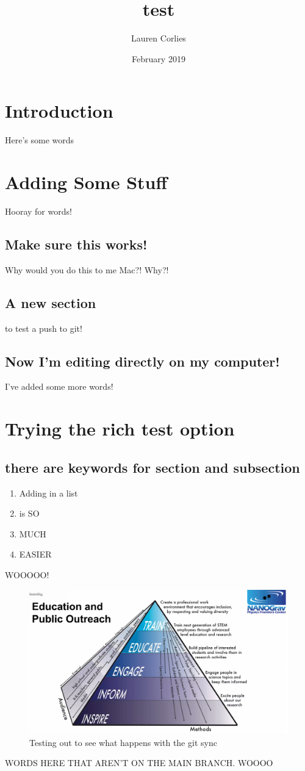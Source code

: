 \documentclass{article}
\title{test}
\author{Lauren Corlies}
\date{February 2019}
\begin{document}
\maketitle

\section{Introduction}
Here's some words

\section{Adding Some Stuff}
Hooray for words!

\subsection{Make sure this works!}
Why would you do this to me Mac?! Why?!

\subsection{A new section}
to test a push to git!

\subsection{Now I'm editing directly on my computer!}
I've added some more words!

\section{Trying the rich test option}
\subsection{there are keywords for section and subsection}
\begin{enumerate}
\item Adding in a list
\item is SO 
\item MUCH
\item EASIER
\end{enumerate}

WOOOOO!

\begin{figure}
    \centering
    \includegraphics[width=1.0\textwidth]{first_figure.png}
    \caption{Testing out to see what happens with the git sync}
    \label{fig:first}
\end{figure}


WORDS HERE THAT AREN'T ON THE MAIN BRANCH. WOOOO
\end{document}
